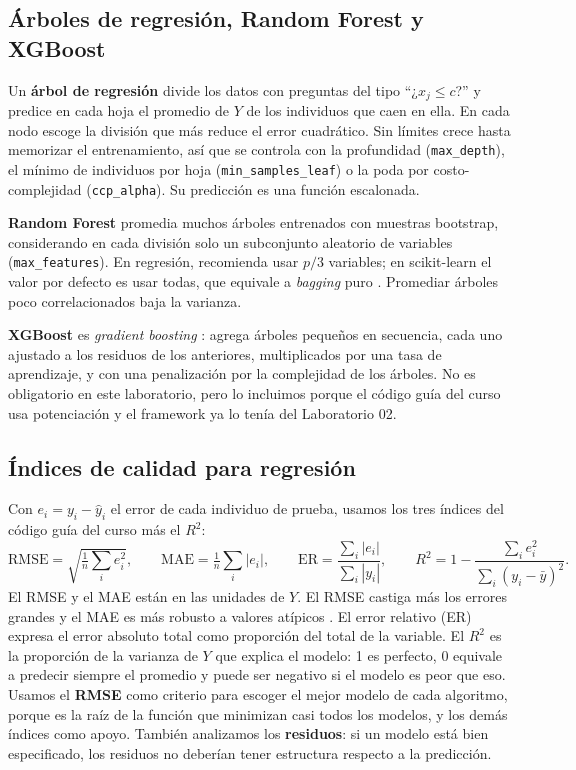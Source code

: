 \documentclass[11pt,a4paper]{article}
\let\citepOriginal\citep
\renewcommand*{\citep}[1]{\textbf{\citepOriginal{#1}}}%
\let\citetOriginal\citet
\renewcommand*{\citet}[1]{\textbf{\citetOriginal{#1}}}%
\begin{document}
\subsection{Árboles de regresión, Random Forest y XGBoost}
Un \textbf{árbol de regresión} \citep{breiman1984} divide los datos con preguntas del tipo ``¿$x_j\le c$?'' y predice en cada hoja el promedio de $Y$ de los individuos que caen en ella. En cada nodo escoge la división que más reduce el error cuadrático. Sin límites crece hasta memorizar el entrenamiento, así que se controla con la profundidad (\texttt{max\_depth}), el mínimo de individuos por hoja (\texttt{min\_samples\_leaf}) o la poda por costo-complejidad (\texttt{ccp\_alpha}). Su predicción es una función escalonada.

\textbf{Random Forest} \citep{breiman2001} promedia muchos árboles entrenados con muestras bootstrap, considerando en cada división solo un subconjunto aleatorio de variables (\texttt{max\_features}). En regresión, \citet{breiman2001} recomienda usar $p/3$ variables; en scikit-learn el valor por defecto es usar todas, que equivale a \textit{bagging} puro \citep{probst2019}. Promediar árboles poco correlacionados baja la varianza.

\textbf{XGBoost} \citep{chen2016} es \textit{gradient boosting} \citep{friedman2001}: agrega árboles pequeños en secuencia, cada uno ajustado a los residuos de los anteriores, multiplicados por una tasa de aprendizaje, y con una penalización por la complejidad de los árboles. No es obligatorio en este laboratorio, pero lo incluimos porque el código guía del curso usa potenciación y el framework ya lo tenía del Laboratorio 02.

\subsection{Índices de calidad para regresión}
Con $e_i=y_i-\hat y_i$ el error de cada individuo de prueba, usamos los tres índices del código guía del curso más el $R^2$:
\[
\text{RMSE}=\sqrt{\tfrac1n\textstyle\sum_i e_i^2},\qquad
\text{MAE}=\tfrac1n\textstyle\sum_i |e_i|,\qquad
\text{ER}=\dfrac{\sum_i|e_i|}{\sum_i|y_i|},\qquad
R^2=1-\dfrac{\sum_i e_i^2}{\sum_i (y_i-\bar y)^2}.
\]
El RMSE y el MAE están en las unidades de $Y$. El RMSE castiga más los errores grandes y el MAE es más robusto a valores atípicos \citep{willmott2005,chai2014}. El error relativo (ER) expresa el error absoluto total como proporción del total de la variable. El $R^2$ es la proporción de la varianza de $Y$ que explica el modelo: 1 es perfecto, 0 equivale a predecir siempre el promedio y puede ser negativo si el modelo es peor que eso. Usamos el \textbf{RMSE} como criterio para escoger el mejor modelo de cada algoritmo, porque es la raíz de la función que minimizan casi todos los modelos, y los demás índices como apoyo. También analizamos los \textbf{residuos}: si un modelo está bien especificado, los residuos no deberían tener estructura respecto a la predicción.
\end{document}
